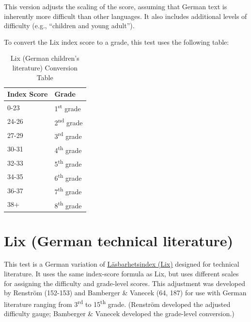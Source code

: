 \documentclass[
]{book}
\theoremstyle{definition}
\theoremstyle{definition}
\theoremstyle{definition}
\theoremstyle{definition}
\theoremstyle{remark}
\begin{document}
This version adjusts the scaling of the score, assuming that German text is inherently more difficult than other languages. It also includes additional levels of difficulty (e.g., ``children and young adult'').

\begin{minipage}{\textwidth}

To convert the Lix index score to a grade, this test uses the following table:

\begin{table}

\caption{\label{tab:unnamed-chunk-44}Lix (German children's literature) Conversion Table}
\centering
\begin{tabular}[t]{ll}
\toprule
Index Score & Grade\\
\midrule
0-23 & 1\textsuperscript{st} grade\\
24-26 & 2\textsuperscript{nd} grade\\
27-29 & 3\textsuperscript{rd} grade\\
30-31 & 4\textsuperscript{th} grade\\
32-33 & 5\textsuperscript{th} grade\\
34-35 & 6\textsuperscript{th} grade\\
36-37 & 7\textsuperscript{th} grade\\
38+ & 8\textsuperscript{th} grade\\
\bottomrule
\end{tabular}
\end{table}

\end{minipage}

\newpage

\hypertarget{lix-german-technical}{%
\section{\texorpdfstring{Lix (German technical literature)}{Lix (German technical literature)}}\label{lix-german-technical}}

This test is a German variation of \protect\hyperlink{lix-test}{Läsbarhetsindex (Lix)} designed for technical literature. It uses the same index-score formula as Lix, but uses different scales for assigning the difficulty and grade-level scores. This adjustment was developed by Renström (152-153) and Bamberger \& Vanecek (64, 187) for use with German literature ranging from 3\textsuperscript{rd} to 15\textsuperscript{th} grade. (Renström developed the adjusted difficulty gauge; Bamberger \& Vanecek developed the grade-level conversion.)
\end{document}
